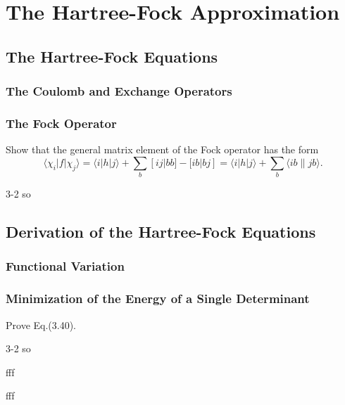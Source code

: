 \documentclass[a4paper]{book}
\newcommand\lr[2]{\langle#1\|#2\rangle}
\begin{document}

	\chapter{The Hartree-Fock Approximation}
	
	\section{The Hartree-Fock Equations}
	
	\subsection{The Coulomb and Exchange Operators}
	
	\subsection{The Fock Operator}
	
	\begin{exercise}
	Show that the general matrix element of the Fock operator has the form
	\[
		\langle \chi_i | f | \chi_j \rangle = \langle i | h | j \rangle + \sum_b [ij|bb] - [ib|bj] = \langle i | h | j \rangle + \sum_b \lr{ib}{jb}.
	\]
	\end{exercise}
	
	\begin{solution}
		3-2 so
	\end{solution}
	
	\section{Derivation of the Hartree-Fock Equations}
	
	\subsection{Functional Variation}
	
	\subsection{Minimization of the Energy of a Single Determinant}

	\begin{exercise}
	Prove Eq.(3.40).
	\end{exercise}
	
	\begin{solution}
		3-2 so
		
		
		fff
		
		fff
	\end{solution}
	
\end{document}
